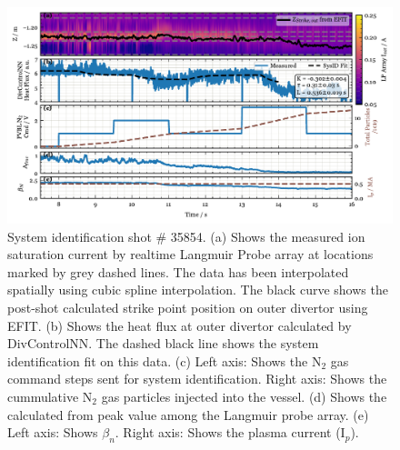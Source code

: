 \begin{figure}[!ht]
 \centering
 \includegraphics[width=\textwidth]{figures/DetCtrl_2D_35854.pdf}
 \caption{System identification shot \# 35854.
(a) Shows the measured ion saturation current by realtime Langmuir Probe array at locations marked by grey dashed lines.
The data has been interpolated spatially using cubic spline interpolation.
The black curve shows the post-shot calculated strike point position on outer divertor using EFIT.
(b) Shows the heat flux at outer divertor calculated by DivControlNN.
The dashed black line shows the system identification fit on this data.
(c) Left axis: Shows the N$_2$ gas command steps sent for system identification.
Right axis: Shows the cummulative N$_2$ gas particles injected into the vessel.
(d) Shows the \Afrac calculated from peak value among the Langmuir probe array.
(e) Left axis: Shows $\beta_n$.
Right axis: Shows the plasma current (I$_p$).}
\label{fig:sysid_sm}
\end{figure}

